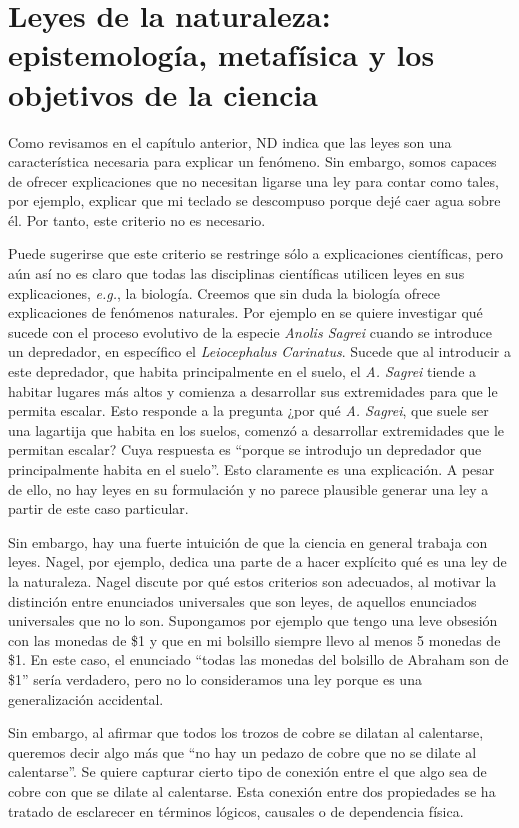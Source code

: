 \section{Leyes de la naturaleza: epistemología, metafísica y los objetivos de la ciencia}

Como revisamos en el capítulo anterior, ND indica que las leyes son una característica necesaria para explicar un fenómeno. Sin embargo, somos capaces de ofrecer explicaciones que no necesitan ligarse una ley para contar como tales, por ejemplo, explicar que mi teclado se descompuso porque dejé caer agua sobre él. Por tanto, este criterio no es necesario.

Puede sugerirse que este criterio se restringe sólo a explicaciones científicas, pero aún así no es claro que todas las disciplinas científicas utilicen leyes en sus explicaciones, \textit{e.g.}, la biología. Creemos que sin duda la biología ofrece explicaciones de fenómenos naturales. Por ejemplo en \cite{Losos2004} se quiere investigar qué sucede con el proceso evolutivo de la especie \textit{Anolis Sagrei} cuando se introduce un depredador, en específico el \textit{Leiocephalus Carinatus}. Sucede que al introducir a este depredador, que habita principalmente en el suelo, el \textit{A. Sagrei} tiende a habitar lugares más altos y comienza a desarrollar sus extremidades para que le permita escalar. Esto responde a la pregunta ¿por qué \textit{A. Sagrei}, que suele ser una lagartija que habita en los suelos, comenzó a desarrollar extremidades que le permitan escalar? Cuya respuesta es ``porque se introdujo un depredador que principalmente habita en el suelo''. Esto claramente es una explicación. A pesar de ello, no hay leyes en su formulación y no parece plausible generar una ley a partir de este caso particular.

Sin embargo, hay una fuerte intuición de que la ciencia en general trabaja con leyes. Nagel, por ejemplo, dedica una parte de \cite{Nagel2006} a hacer explícito qué es una ley de la naturaleza. Nagel discute por qué estos criterios son adecuados, al motivar la distinción entre enunciados universales que son leyes, de aquellos enunciados universales que no lo son. Supongamos por ejemplo que tengo una leve obsesión con las monedas de \$1 y que en mi bolsillo siempre llevo al menos 5 monedas de \$1. En este caso, el enunciado ``todas las monedas del bolsillo de Abraham son de \$1'' sería verdadero, pero no lo consideramos una ley porque es una generalización accidental.

Sin embargo, al afirmar que todos los trozos de cobre se dilatan al calentarse, queremos decir algo más que ``no hay un pedazo de cobre que no se dilate al calentarse''. Se quiere capturar cierto tipo de conexión entre el que algo sea de cobre con que se dilate al calentarse. Esta conexión entre dos propiedades se ha tratado de esclarecer en términos lógicos, causales o de dependencia física.

